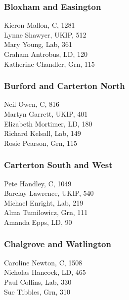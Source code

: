 \documentclass[a4paper,openany,10pt]{book}
\begin{document}
\subsubsection*{Bloxham and Easington}



Kieron Mallon, C, 1281\\
Lynne Shawyer, UKIP, 512\\
Mary Young, Lab, 361\\
Graham Antrobus, LD, 120\\
Katherine Chandler, Grn, 115\\


\subsubsection*{Burford and Carterton North}



Neil Owen, C, 816\\
Martyn Garrett, UKIP, 401\\
Elizabeth Mortimer, LD, 180\\
Richard Kelsall, Lab, 149\\
Rosie Pearson, Grn, 115\\


\subsubsection*{Carterton South and West}



Pete Handley, C, 1049\\
Barclay Lawrence, UKIP, 540\\
Michael Enright, Lab, 219\\
Alma Tumilowicz, Grn, 111\\
Amanda Epps, LD, 90\\


\subsubsection*{Chalgrove and Watlington}



Caroline Newton, C, 1508\\
Nicholas Hancock, LD, 465\\
Paul Collins, Lab, 330\\
Sue Tibbles, Grn, 310\\
\end{document}
